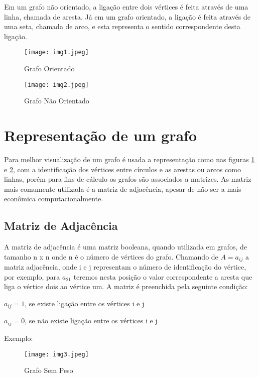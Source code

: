 Em um grafo não orientado, a ligação entre dois vértices é feita através de uma linha, chamada de aresta. Já em um grafo orientado, a ligação é feita através de uma seta, chamada de arco, e esta representa o sentido correspondente desta ligação.

\begin{figure}[h!]
	\centering
	\texttt{[image: img1.jpeg]}
	\caption{Grafo Orientado}
	\label{img1}
\end{figure}
\begin{figure}[h!]
	\centering
	\texttt{[image: img2.jpeg]}
	\caption{Grafo Não Orientado}
	\label{img2}
\end{figure}

\section{Representação de um grafo}

Para melhor visualização de um grafo é usada a representação como nas figuras \ref{img1} e \ref{img2}, com a identificação dos vértices entre círculos e as arestas ou arcos como linhas, porém para fins de cálculo os grafos são associados a matrizes. As matriz mais comumente utilizada é a matriz de adjacência, apesar de não ser a mais econômica computacionalmente.

\subsection{Matriz de Adjacência}

A matriz de adjacência é uma matriz booleana, quando utilizada em grafos, de tamanho n x n onde n é o número de vértices do grafo. Chamando de $A=a_{ij}$ a matriz adjacência, onde i  e j representam o número de identificação do vértice, por exemplo, para $a_{21}$ teremos nesta posição o valor correspondente a aresta que liga o vértice dois ao vértice um. A matriz é preenchida pela seguinte condição:

$a_{ij}=1$, se existe ligação entre os vértices i e j

$a_{ij}=0$, se não existe ligação entre os vértices i e j

Exemplo:

\begin{figure}[h!]
	\centering
	\texttt{[image: img3.jpeg]}
	\caption{Grafo Sem Peso}
	\label{img3}
\end{figure}

